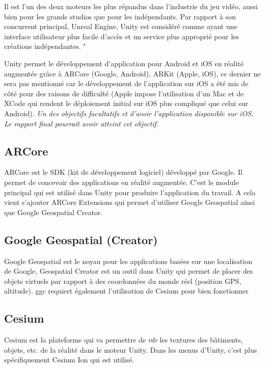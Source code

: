 Il est l'un des deux moteurs les plus répandus dans l'industrie du jeu vidéo,
aussi bien pour les grands studios que pour les indépendants. Par rapport à son concurrent principal,
Unreal Engine, Unity est considéré comme ayant une interface utilisateur plus facile d'accès et un service plus approprié pour les créations indépendantes.
"\cite{UnityMoteurJeu2025}

Unity permet le développement d'application pour Android et iOS en réalité augmentée grâce à ARCore (Google, Android), ARKit (Apple, iOS), ce dernier ne sera pas mentionné car le
développement de l'application sur iOS a été mis de côté pour des raisons de difficulté (Apple impose l'utilisation d'un Mac et de XCode qui rendent le déploiement initial sur iOS plus
compliqué que celui sur Android). \textit{Un des objectifs facultatifs et d'avoir l'application disponible sur iOS. Le rapport final pourrait avoir atteint cet objectif.}

\subsection{ARCore}
ARCore est le SDK (kit de développement logiciel) développé par Google. Il permet de concevoir des applications en réalité augmentée. C'est le module principal qui est utilisé dans Unity pour produire l'application du travail.
A cela vient s'ajouter ARCore Extensions qui permet d'utiliser Google Geospatial ainsi que Google Geospatial Creator.
\subsection{Google Geospatial (Creator)}
Google Geospatial est le noyau pour les applications basées sur une localisation de Google, Geospatial Creator est un outil dans Unity qui permet de placer des objets virtuels par rapport à
des coordonnées du monde réel (position GPS, altitude). \acrshort{ggc} requiert également l'utilisation de Cesium pour bien fonctionner


\subsection{Cesium}
Cesium est la plateforme qui va permettre de \textit{\acrshort{rdr}} les textures des bâtiments, objets, etc. de la réalité dans le moteur Unity.
Dans les menus d'Unity, c'est plus spécifiquement Cesium Ion qui est utilisé.

